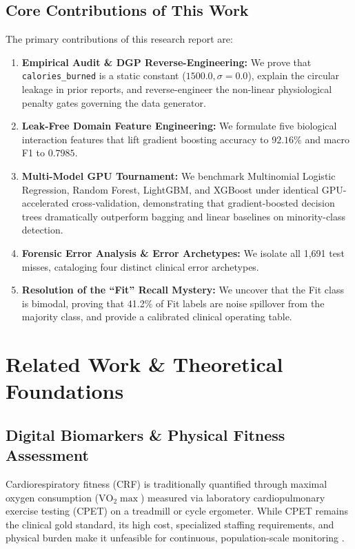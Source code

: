 \documentclass[11pt,a4paper]{article}
\begin{document}
\subsection{Core Contributions of This Work}
The primary contributions of this research report are:
\begin{enumerate}[leftmargin=*,itemsep=1pt]
    \item \textbf{Empirical Audit \& DGP Reverse-Engineering:} We prove that \texttt{calories\_burned} is a static constant ($1500.0, \sigma=0.0$), explain the circular leakage in prior reports, and reverse-engineer the non-linear physiological penalty gates governing the data generator.
    \item \textbf{Leak-Free Domain Feature Engineering:} We formulate five biological interaction features that lift gradient boosting accuracy to $\mathbf{92.16\%}$ and macro F1 to $\mathbf{0.7985}$.
    \item \textbf{Multi-Model GPU Tournament:} We benchmark Multinomial Logistic Regression, Random Forest, LightGBM, and XGBoost under identical GPU-accelerated cross-validation, demonstrating that gradient-boosted decision trees dramatically outperform bagging and linear baselines on minority-class detection.
    \item \textbf{Forensic Error Analysis \& Error Archetypes:} We isolate all 1,691 test misses, cataloging four distinct clinical error archetypes.
    \item \textbf{Resolution of the ``Fit'' Recall Mystery:} We uncover that the Fit class is bimodal, proving that 41.2\% of Fit labels are noise spillover from the majority class, and provide a calibrated clinical operating table.
\end{enumerate}

\section{Related Work \& Theoretical Foundations}

\subsection{Digital Biomarkers \& Physical Fitness Assessment}
Cardiorespiratory fitness (CRF) is traditionally quantified through maximal oxygen consumption ($\text{VO}_2\max$) measured via laboratory cardiopulmonary exercise testing (CPET) on a treadmill or cycle ergometer. While CPET remains the clinical gold standard, its high cost, specialized staffing requirements, and physical burden make it unfeasible for continuous, population-scale monitoring \citep{ross2016}. 
\end{document}
